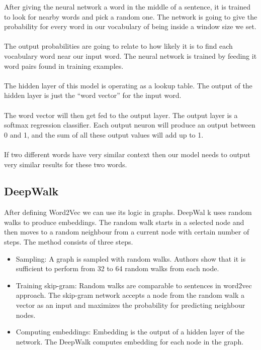 \noindent After giving the neural network a word in the middle of a sentence, it is trained to look for nearby words and pick a random one. The network is going to give the probability for every word in our vocabulary of being inside a window size we set.		
 \\		
 \\		
 The output probabilities are going to relate to how likely it is to find each vocabulary word near our input word. The neural network is trained by feeding it word pairs found in training examples.		
 \\		
 \\		
 The hidden layer of this model is operating as a lookup table. The output of the hidden layer is just the “word vector” for the input word.		
 \\		
 \\		
 The word vector will then get fed to the output layer. The output layer is a softmax regression classifier. Each output neuron will produce an output between 0 and 1, and the sum of all these output values will add up to 1.		
 \\		
 \\		
 If two different words have very similar context then our model needs to output very similar results for these two words.		

 
  \subsection{DeepWalk}		

  After defining Word2Vec we can use its logic in graphs. DeepWal k uses random walks to produce embeddings. The random walk starts in a selected node and then moves to a random neighbour from a current node with certain number of steps. The method consists of three steps.		

   \begin{itemize}		
   \item Sampling: A graph is sampled with random walks. Authors show that it is sufficient to perform from 32 to 64 random walks from each node. 		

 
    \item Training skip-gram: Random walks are comparable to sentences in word2vec approach. The skip-gram network accepts a node from the random walk a vector as an input and maximizes the probability for predicting neighbour nodes. 		

    \item Computing embeddings: Embedding is the output of a hidden layer of the network. The DeepWalk computes embedding for each node in the graph.		

    \end{itemize}		

